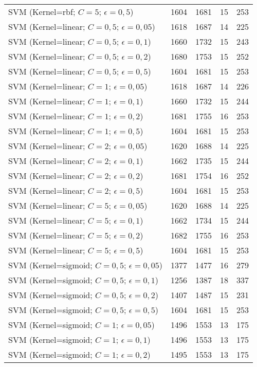 \begin{center}
\begin{longtable}{|l|l|l|l|l|}
SVM (Kernel=rbf; $C=5$; $\epsilon=0,5$) & 1604 & 1681 & 15 & 253 \\
SVM (Kernel=linear; $C=0,5$; $\epsilon=0,05$) & 1618 & 1687 & 14 & 225 \\
SVM (Kernel=linear; $C=0,5$; $\epsilon=0,1$) & 1660 & 1732 & 15 & 243 \\
SVM (Kernel=linear; $C=0,5$; $\epsilon=0,2$) & 1680 & 1753 & 15 & 252 \\
SVM (Kernel=linear; $C=0,5$; $\epsilon=0,5$) & 1604 & 1681 & 15 & 253 \\
SVM (Kernel=linear; $C=1$; $\epsilon=0,05$) & 1618 & 1687 & 14 & 226 \\
SVM (Kernel=linear; $C=1$; $\epsilon=0,1$) & 1660 & 1732 & 15 & 244 \\
SVM (Kernel=linear; $C=1$; $\epsilon=0,2$) & 1681 & 1755 & 16 & 253 \\
SVM (Kernel=linear; $C=1$; $\epsilon=0,5$) & 1604 & 1681 & 15 & 253 \\
SVM (Kernel=linear; $C=2$; $\epsilon=0,05$) & 1620 & 1688 & 14 & 225 \\
SVM (Kernel=linear; $C=2$; $\epsilon=0,1$) & 1662 & 1735 & 15 & 244 \\
SVM (Kernel=linear; $C=2$; $\epsilon=0,2$) & 1681 & 1754 & 16 & 252 \\
SVM (Kernel=linear; $C=2$; $\epsilon=0,5$) & 1604 & 1681 & 15 & 253 \\
SVM (Kernel=linear; $C=5$; $\epsilon=0,05$) & 1620 & 1688 & 14 & 225 \\
SVM (Kernel=linear; $C=5$; $\epsilon=0,1$) & 1662 & 1734 & 15 & 244 \\
SVM (Kernel=linear; $C=5$; $\epsilon=0,2$) & 1682 & 1755 & 16 & 253 \\
SVM (Kernel=linear; $C=5$; $\epsilon=0,5$) & 1604 & 1681 & 15 & 253 \\
SVM (Kernel=sigmoid; $C=0,5$; $\epsilon=0,05$) & 1377 & 1477 & 16 & 279 \\
SVM (Kernel=sigmoid; $C=0,5$; $\epsilon=0,1$) & 1256 & 1387 & 18 & 337 \\
SVM (Kernel=sigmoid; $C=0,5$; $\epsilon=0,2$) & 1407 & 1487 & 15 & 231 \\
SVM (Kernel=sigmoid; $C=0,5$; $\epsilon=0,5$) & 1604 & 1681 & 15 & 253 \\
SVM (Kernel=sigmoid; $C=1$; $\epsilon=0,05$) & 1496 & 1553 & 13 & 175 \\
SVM (Kernel=sigmoid; $C=1$; $\epsilon=0,1$) & 1496 & 1553 & 13 & 175 \\
SVM (Kernel=sigmoid; $C=1$; $\epsilon=0,2$) & 1495 & 1553 & 13 & 175 \\

\end{longtable}
\end{center}
